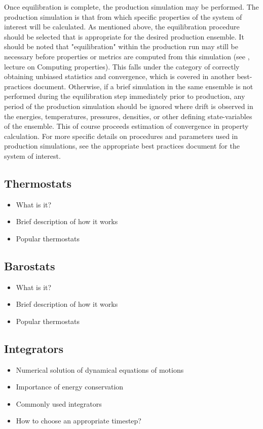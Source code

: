 \documentclass[9pt,bestpractices]{livecoms}
\begin{document}
Once equilibration is complete, the production simulation may be performed. 
The production simulation is that from which specific properties of the system of interest will be calculated. 
As mentioned above, the equilibration procedure should be selected that is appropriate for the desired production ensemble. 
It should be noted that "equilibration" within the production run may still be necessary before properties or metrics are computed from this simulation (see \citet{ShellNotes}, lecture on Computing properties). 
This falls under the category of correctly obtaining unbiased statistics and convergence, which is covered in another best-practices document. %
Otherwise, if a brief simulation in the same ensemble is not performed during the equilibration step immediately prior to production, any period of the production simulation should be ignored where drift is observed in the energies, temperatures, pressures, densities, or other defining state-variables of the ensemble. 
This of course proceeds estimation of convergence in property calculation.
For more specific details on procedures and parameters used in production simulations, see the appropriate best practices document for the system of interest.

\subsection{Thermostats}
\begin{itemize}
\item What is it?
\item Brief description of how it works
\item Popular thermostats
\end{itemize}

\subsection{Barostats}
\begin{itemize}
\item What is it?
\item Brief description of how it works
\item Popular thermostats
\end{itemize}

\subsection{Integrators}
\begin{itemize}
\item Numerical solution of dynamical equations of motions
\item Importance of energy conservation
\item Commonly used integrators
\item How to choose an appropriate timestep?
\end{itemize}
\end{document}
